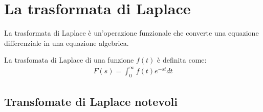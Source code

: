 \section{La trasformata di Laplace}

La trasformata di Laplace è un'operazione funzionale che converte una equazione differenziale in una equazione algebrica.

La trasfomata di Laplace di una funzione $f(t)$ è definita come:
\begin{align}
	F(s) = \int_{0}^{\infty} f(t) e^{-st} dt
\end{align}

\subsection{Transfomate di Laplace notevoli}
\renewcommand{\arraystretch}{2.0}
